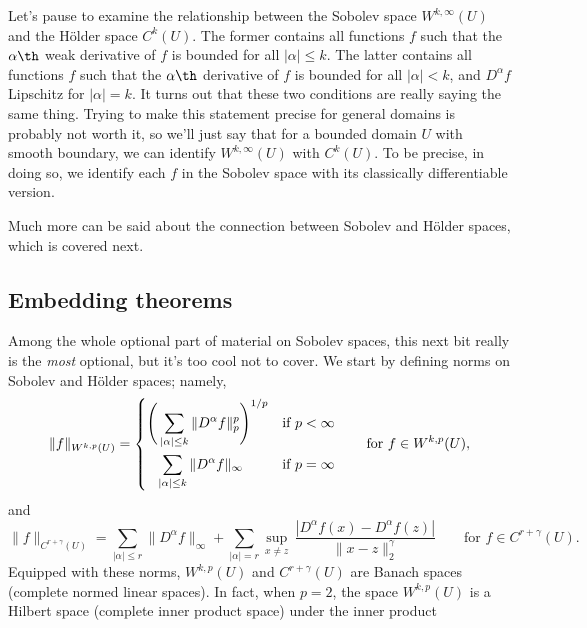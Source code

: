 \documentclass{article}
\begin{document}
Let's pause to examine the relationship between the Sobolev space
$W^{k,\infty}(U)$ and the H{\"o}lder space $C^k(U)$. The former contains all
functions $f$ such that the $\alpha\th$ weak derivative of $f$ is bounded for
all $|\alpha| \leq k$. The latter contains all functions $f$ such that the
$\alpha\th$ derivative of $f$ is bounded for all $|\alpha| < k$, and $D^\alpha
f$ Lipschitz for $|\alpha| = k$. It turns out that these two conditions are
really saying the same thing. Trying to make this statement precise for general
domains is probably not worth it, so we'll just say that for a bounded domain
$U$ with smooth boundary, we can identify $W^{k,\infty}(U)$ with $C^k(U)$. To be
precise, in doing so, we identify each $f$ in the Sobolev space with its
classically differentiable version.  


Much more can be said about the connection between Sobolev and H{\"o}lder
spaces, which is covered next.

\subsection{Embedding theorems}

Among the whole optional part of material on Sobolev spaces, this next bit   
really is the \emph{most} optional, but it's too cool not to cover. We start by
defining norms on Sobolev and H{\"o}lder spaces; namely,
\[
\|f\|_{W^{k,p}(U)} = 
\begin{dcases} 
\Bigg( \sum_{|\alpha| \leq k} \|D^\alpha f\|_p^p \Bigg)^{1/p} & \text{if $p <
  \infty$} \\
\;\;\; \sum_{|\alpha| \leq k} \|D^\alpha f\|_\infty & \text{if $p = \infty$}   
\end{dcases}
\qquad \text{for $f \in W^{k,p}(U)$},
\]
and 
\[
\|f\|_{C^{r+\gamma}(U)} = \sum_{|\alpha| \leq r} \|D^\alpha f\|_\infty +
\sum_{|\alpha| = r} \sup_{x \not= z} \, \frac{|D^\alpha f(x) - D^\alpha f(z)|} 
{\|x-z\|_2^\gamma}
\qquad \text{for $f \in C^{r+\gamma}(U)$}. 
\] 
Equipped with these norms, $W^{k,p}(U)$ and $C^{r+\gamma}(U)$ are Banach 
spaces (complete normed linear spaces). In fact, when $p=2$, the space
$W^{k,p}(U)$ is a Hilbert space (complete inner product space) under the inner
product 
\end{document}
